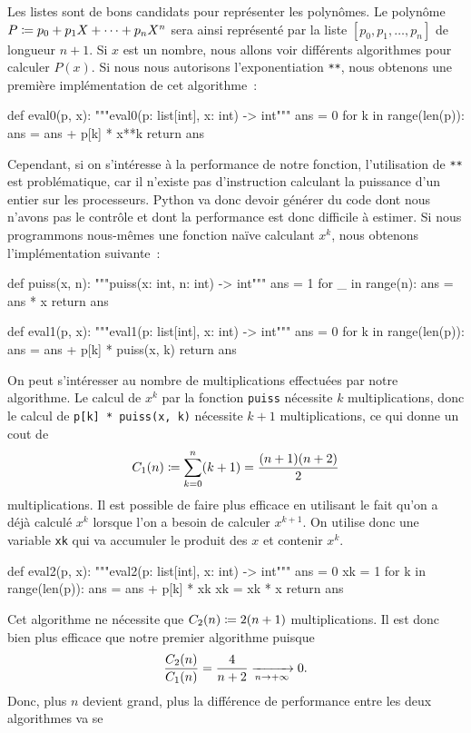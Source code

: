 \documentclass{magnoliaold}
\begin{document}
Les listes sont de bons candidats pour représenter les polynômes. Le polynôme 
$P\coloneqq p_0+p_1X+\cdots+p_n X^n$ sera ainsi représenté par la liste
$[p_0,p_1,\ldots,p_n]$ de longueur $n+1$. Si $x$ est un nombre, nous allons voir
différents algorithmes pour calculer $P(x)$. Si nous nous autorisons
l'exponentiation \verb!**!, nous obtenons une première
implémentation de cet algorithme~:
\begin{pythoncode}
def eval0(p, x):
    """eval0(p: list[int], x: int) -> int"""
    ans = 0
    for k in range(len(p)):
        ans = ans + p[k] * x**k
    return ans
\end{pythoncode}
Cependant, si on s'intéresse à la performance de notre fonction, l'utilisation de \verb!**!
est problématique, car il n'existe pas d'instruction calculant la puissance d'un entier sur les
processeurs. Python va donc devoir générer du code dont nous n'avons pas le contrôle et dont
la performance est donc difficile à estimer. Si nous programmons nous-mêmes une
fonction naïve calculant $x^k$, nous obtenons l'implémentation suivante~:
\begin{pythoncode}
def puiss(x, n):
    """puiss(x: int, n: int) -> int"""
    ans = 1
    for _ in range(n):
        ans = ans * x
    return ans

def eval1(p, x):
    """eval1(p: list[int], x: int) -> int"""
    ans = 0
    for k in range(len(p)):
        ans = ans + p[k] * puiss(x, k)
    return ans
\end{pythoncode}
On peut s'intéresser au nombre de multiplications effectuées par notre algorithme. Le calcul
de $x^k$ par la fonction \verb!puiss! nécessite $k$ multiplications, donc le calcul de
\verb!p[k] * puiss(x, k)! nécessite $k+1$ multiplications, ce qui donne un cout de
\[C_1(n)\coloneqq \sum_{k=0}^n (k+1)=\frac{(n+1)(n+2)}{2}\]
multiplications. Il est possible de faire plus efficace en utilisant le fait qu'on a déjà calculé
$x^k$ lorsque l'on a besoin de calculer $x^{k+1}$. On utilise donc une variable \verb!xk! qui va accumuler le
produit des $x$ et contenir $x^k$.
\begin{pythoncode}
def eval2(p, x):
    """eval2(p: list[int], x: int) -> int"""
    ans = 0
    xk = 1
    for k in range(len(p)):
        ans = ans + p[k] * xk
        xk = xk * x
    return ans
\end{pythoncode}
Cet algorithme ne nécessite que $C_2(n)\coloneqq 2(n+1)$ multiplications. Il est donc bien plus efficace
que notre premier algorithme puisque
\[\frac{C_2(n)}{C_1(n)}=\frac{4}{n+2}\xrightarrow[n\rightarrow +\infty]{}0.\]
Donc, plus $n$ devient grand, plus la différence de  performance entre les deux algorithmes va se
\end{document}
